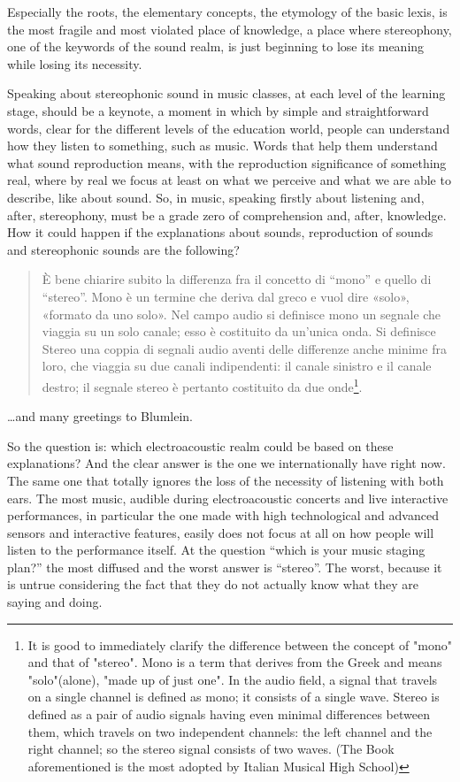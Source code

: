 \documentclass{article}
\begin{document}
Especially the roots, the elementary concepts, the etymology of the basic lexis, is the most fragile and most violated place of knowledge, a place where stereophony, one of the keywords of the sound realm, is just beginning to lose its meaning while losing its necessity.

Speaking about stereophonic sound in music classes, at each level of the learning stage, should be a keynote, a moment in which by simple and straightforward words, clear for the different levels of the education world, people can understand how they listen to something, such as music. Words that help them understand what sound reproduction means, with the reproduction significance of something real, where by real we focus at least on what we perceive and what we are able to describe, like about sound. So, in music, speaking firstly about listening and, after, stereophony, must be a grade zero of comprehension and, after, knowledge. How it could happen if the explanations about sounds, reproduction of sounds and stereophonic sounds are the following?

\begin{quotation}
È bene chiarire subito la differenza fra il concetto di “mono” e quello di “stereo”. Mono è un termine che deriva dal greco e vuol dire «solo», «formato da uno solo». Nel campo audio si definisce mono un segnale che viaggia su un solo canale; esso è costituito da un'unica onda. Si definisce Stereo una coppia di segnali audio aventi delle differenze anche minime fra loro, che viaggia su due canali indipendenti: il canale sinistro e il canale destro; il segnale stereo è pertanto costituito da due onde\footnote{It is good to immediately clarify the difference between the concept of "mono" and that of "stereo". Mono is a term that derives from the Greek and means "solo"(alone), "made up of just one". In the audio field, a signal that travels on a single channel is defined as mono; it consists of a single wave. Stereo is defined as a pair of audio signals having even minimal differences between them, which travels on two independent channels: the left channel and the right channel; so the stereo signal consists of two waves. (The Book aforementioned is the most adopted by Italian Musical High School)}. \cite{labtec01}
\end{quotation}

\ldots and many greetings to Blumlein.

So the question is: which electroacoustic realm could be based on these explanations? And the clear answer is the one we internationally have right now. The same one that totally ignores the loss of the necessity of listening with both ears. The most music, audible during electroacoustic concerts and live interactive performances, in particular the one made with high technological and advanced sensors and interactive features, easily does not focus at all on how people will listen to the performance itself. At the question “which is your music staging plan?” the most diffused  and the worst answer is “stereo”. The worst, because it is untrue considering the fact that they do not actually know what they are saying and doing.
\end{document}
